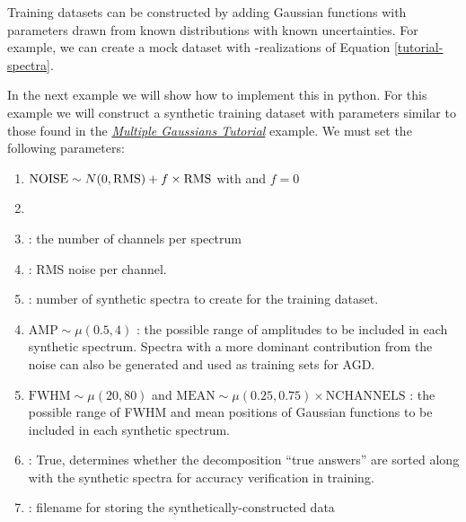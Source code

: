 \documentclass[letterpaper,10pt,openany,oneside]{sphinxmanual}
\begin{document}
Training datasets can be constructed by adding Gaussian functions with
parameters drawn from known distributions with known uncertainties. For example,
we can create a mock dataset with -realizations of Equation
\eqref{tutorial-spectra}.

In the next example we will show how to implement this in python. For this
example we will construct a synthetic training dataset with parameters similar
to those found in the {\hyperref[tutorial:multiple\string-gaussians\string-tutorial]{\emph{Multiple Gaussians Tutorial}}} example. We must set
the following parameters:
\begin{enumerate}
\item {} 
\(\mathrm{NOISE} \sim N(0, {\rm RMS}) + f \times {\rm RMS}\)
with  and \(f=0\)

\item {} 

\item {} 
 : the number of channels per spectrum

\item {} 
 : RMS noise per channel.

\item {} 
 : number of synthetic spectra to create for the training dataset.

\end{enumerate}
\begin{enumerate}
\setcounter{enumi}{3}
\item {} 
\(\mathrm{AMP} \sim \mu(0.5, 4)\) : the possible range of amplitudes to be included in each synthetic spectrum. Spectra with a more dominant contribution
from the noise can also be generated and used as training sets for AGD.

\item {} 
\(\mathrm{FWHM} \sim \mu(20, 80)\) and \(\mathrm{MEAN}\sim \mu(0.25, 0.75) \times \mathrm{NCHANNELS}\) : the possible range of FWHM and mean positions of Gaussian functions to be included in each synthetic spectrum.

\item {} 
 : True, determines whether the decomposition ``true answers''
are sorted along with the synthetic spectra for accuracy verification in
training.

\item {} 
 : filename for storing the synthetically-constructed data

\end{enumerate}
\end{document}
